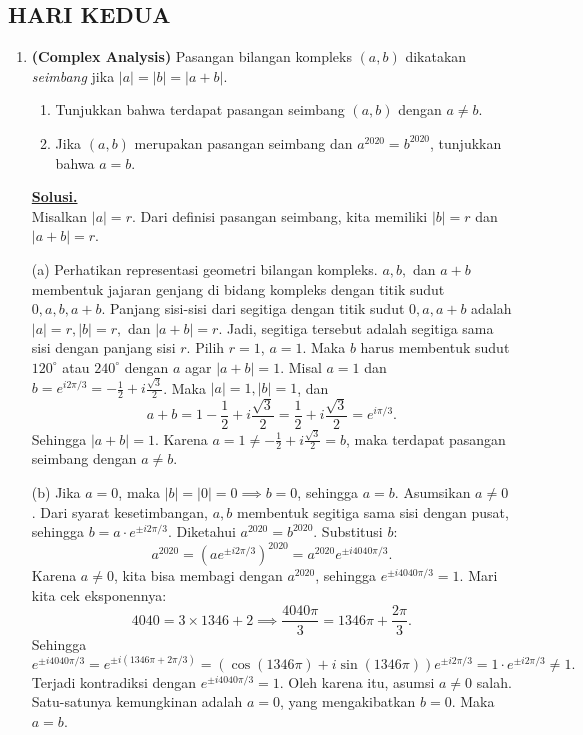 \documentclass[12pt,twoside]{article}
\newenvironment{solution}
{
	\par\noindent\textbf{\underline{Solusi.}}\\
}
{
	\par
}
\begin{document}
\subsection{HARI KEDUA}
\begin{enumerate}
  \item \textbf{(Complex Analysis)} Pasangan bilangan kompleks $(a,b)$ dikatakan \textit{seimbang} jika $|a| = |b| = |a + b|$.
        \begin{enumerate}
          \item[(a)] Tunjukkan bahwa terdapat pasangan seimbang $(a,b)$ dengan $a \ne b$.
          \item[(b)] Jika $(a,b)$ merupakan pasangan seimbang dan $a^{2020} = b^{2020}$, tunjukkan bahwa $a = b$.
        \end{enumerate}
        \begin{solution}
          Misalkan $|a|=r$. Dari definisi pasangan seimbang, kita memiliki $|b|=r$ dan $|a+b|=r$.

          (a) Perhatikan representasi geometri bilangan kompleks. $a, b,$ dan $a+b$ membentuk jajaran genjang di bidang kompleks dengan titik sudut $0, a, b, a+b$. Panjang sisi-sisi dari segitiga dengan titik sudut $0, a, a+b$ adalah $|a|=r, |b|=r,$ dan $|a+b|=r$.
          Jadi, segitiga tersebut adalah segitiga sama sisi dengan panjang sisi $r$.
          Pilih $r=1$, $a=1$. Maka $b$ harus membentuk sudut $120^\circ$ atau $240^\circ$ dengan $a$ agar $|a+b|=1$.
          Misal $a=1$ dan $b = e^{i 2\pi/3} = -\frac{1}{2} + i\frac{\sqrt{3}}{2}$.
          Maka $|a|=1, |b|=1$, dan
          \[ a+b = 1 - \frac{1}{2} + i\frac{\sqrt{3}}{2} = \frac{1}{2} + i\frac{\sqrt{3}}{2} = e^{i \pi/3}. \]
          Sehingga $|a+b|=1$.
          Karena $a = 1 \ne -\frac{1}{2} + i\frac{\sqrt{3}}{2} = b$, maka terdapat pasangan seimbang dengan $a \ne b$.

          (b) Jika $a=0$, maka $|b|=|0|=0 \implies b=0$, sehingga $a=b$.
          Asumsikan $a \ne 0$. Dari syarat kesetimbangan, $a, b$ membentuk segitiga sama sisi dengan pusat, sehingga $b = a \cdot e^{\pm i 2\pi/3}$.
          Diketahui $a^{2020} = b^{2020}$. Substitusi $b$:
          \[ a^{2020} = (a e^{\pm i 2\pi/3})^{2020} = a^{2020} e^{\pm i 4040\pi/3}. \]
          Karena $a \ne 0$, kita bisa membagi dengan $a^{2020}$, sehingga $e^{\pm i 4040\pi/3} = 1$.
          Mari kita cek eksponennya:
          \[ 4040 = 3 \times 1346 + 2 \implies \frac{4040\pi}{3} = 1346\pi + \frac{2\pi}{3}. \]
          Sehingga
          \[ e^{\pm i 4040\pi/3} = e^{\pm i (1346\pi + 2\pi/3)} = (\cos(1346\pi) + i\sin(1346\pi)) e^{\pm i 2\pi/3} = 1 \cdot e^{\pm i 2\pi/3} \ne 1. \]
          Terjadi kontradiksi dengan $e^{\pm i 4040\pi/3} = 1$.
          Oleh karena itu, asumsi $a \ne 0$ salah.
          Satu-satunya kemungkinan adalah $a=0$, yang mengakibatkan $b=0$. Maka $a=b$.
        \end{solution}


\end{enumerate}
\end{document}
